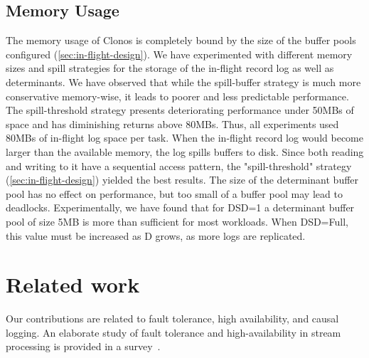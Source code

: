 \documentclass[sigconf]{acmart}
\begin{document}
\subsection{Memory Usage}
The memory usage of Clonos is completely bound by the size of the buffer pools configured (\autoref{sec:in-flight-design}).
We have experimented with different memory sizes and spill strategies for the storage of the in-flight record log as well as determinants. 
We have observed that while the spill-buffer strategy is much more conservative memory-wise, it leads to poorer and less predictable performance. The spill-threshold strategy presents deteriorating performance under 50MBs of space and has diminishing returns above 80MBs.
Thus, all experiments used 80MBs of in-flight log space per task.
When the in-flight record log would become larger than the available memory, the log spills buffers to disk.
Since both reading and writing to it have a sequential access pattern, the "spill-threshold" strategy (\autoref{sec:in-flight-design}) yielded the best results.
The size of the determinant buffer pool has no effect on performance, but too small of a buffer pool may lead to deadlocks. 
Experimentally, we have found that for DSD=1 a determinant buffer pool of size 5MB is more than sufficient for most workloads. When DSD=Full, this value must be increased as D grows, as more logs are replicated.





\section{Related work}
\label{sec:related-work}

Our contributions are related to fault tolerance, high availability, and causal logging.
An elaborate study of fault tolerance and high-availability in stream processing is provided in a survey~\cite{fragkoulis2020survey}.
\end{document}
